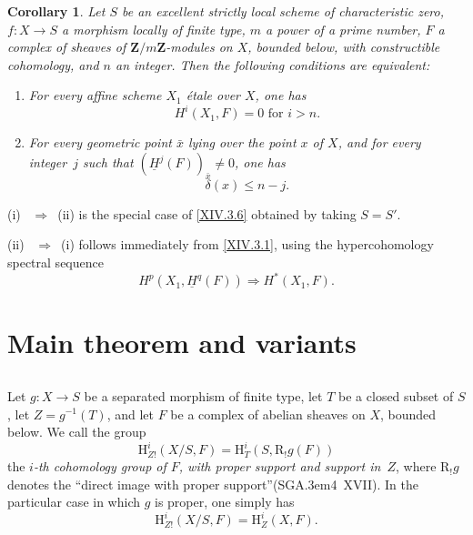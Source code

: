 \documentclass[11pt,a4paper,oneside]{book}
\providecommand{\sisi}[2]{#2}
\providecommand{\pageoriginale}{%
  \refstepcounter{pageoriginal}%
  \marginpar{\raggedright\footnotesize\bfseries\thepageoriginal}%
  \xspace}
\providecommand{\og}{``}
\providecommand{\fg}{''\xspace}
\providecommand{\SGA}{\textup{SGA}\kern.3em}
\providecommand{\ZZ}{\mathbf Z}
\renewcommand{\H}{\mathrm H}
\providecommand{\R}{\mathrm R}
\providecommand{\To}{\Longrightarrow}
\providecommand{\ALORS}{\unskip~$\Longrightarrow$~\ignorespaces}
\newenvironment{enumeratei}
  {\begin{enumerate}[label=(\roman*)]}
  {\end{enumerate}}
\theoremstyle{plain}
\newtheorem{corollaire}[subsection]{Corollary}
\theoremstyle{definition}
\theoremstyle{remark}
\renewcommand{\Ref}[1]{\textup{\ref{#1}}}
\begin{document}
\begin{corollaire} \label{XIV.3.7}
Let $S$ be an excellent strictly local scheme of characteristic zero, $f:X \to S$ a morphism locally of finite type, $m$ a power of a prime number, $F$ a complex of sheaves of $\ZZ/m\ZZ$-modules on $X$, bounded\sisi{}{} below, with constructible cohomology, and $n$ an integer. Then the following conditions are equivalent:
\begin{enumeratei}
\item
For every affine scheme $X_1$ \'{e}tale over $X$, one has
$$
H^i(X_1, F)=0\text{ for }i>n.
$$

\item
For\pageoriginale every geometric point $\bar{x}$ lying over the point $x$ of $X$, and for every integer~$j$ such that $(\underline{H}^j(F))_{\bar{x}} \neq 0$, one has
$$
\delta(x) \leq n-j.
$$
\end{enumeratei}
\end{corollaire}

\textup{(i)} \ALORS \textup{(ii)} is the special case of \Ref{XIV.3.6} obtained by taking $S=S'$.

\textup{(ii)} \ALORS \textup{(i)} follows immediately from \Ref{XIV.3.1}, using the hypercohomology spectral sequence
$$
H^p(X_1, \underline{H}^q(F)) \To H^*(X_1, F).
$$

\section{Main theorem and variants} \label{XIV.4}

\setcounter{subsection}{-1}

\subsection{\texorpdfstring{}{XIV.4.0}} \label{XIV.4.0}
Let $g\colon X\to S$ be a separated morphism of finite type, let $T$ be a closed subset of $S$, let \hbox{$Z=g^{-1}(T)$}, and let $F$ be a complex of abelian sheaves on $X$, bounded below. We call the group
$$
\H_{Z!}^{i}(X/S, F)=\H_{T}^{i}(S, \R_{!}g(F))
$$
the \emph{$i$-th cohomology group of $F$, with proper support and support in~$Z$}, where $\R_{!}g$ denotes the \og direct image with proper support\fg (\SGA 4~XVII). In the particular case in which $g$ is proper, one simply has
$$
\H_{Z!}^{i}(X/S, F)=\H_{Z}^{i}(X, F).
$$
\end{document}
